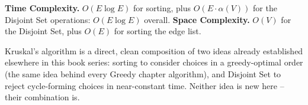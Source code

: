 \begin{complexitybox}
\textbf{Time Complexity.} $O(E \log E)$ for sorting, plus
$O(E \cdot \alpha(V))$ for the Disjoint Set operations:
$O(E \log E)$ overall.
\textbf{Space Complexity.} $O(V)$ for the Disjoint Set, plus $O(E)$ for
sorting the edge list.
\end{complexitybox}

\begin{takeawaybox}
Kruskal's algorithm is a direct, clean composition of two ideas already
established elsewhere in this book series: sorting to consider choices
in a greedy-optimal order (the same idea behind every Greedy chapter
algorithm), and Disjoint Set to reject cycle-forming choices in
near-constant time. Neither idea is new here -- their combination is.
\end{takeawaybox}

